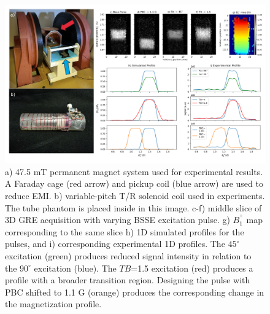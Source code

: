 \documentclass{article}
\renewcommand{\textcolor}[1]{}
\begin{document}
\begin{figure}[h]
\centering
\includegraphics[width=1.1\textwidth]{figures/experimental_2D_processed_Rev2.png}
\caption{a) 47.5 mT permanent magnet system used for experimental results. A Faraday cage (red arrow) and pickup coil (blue arrow) are used to reduce EMI. b) variable-pitch T/R solenoid coil used in experiments. The tube phantom is placed inside in this image. c-f) middle slice of 3D GRE acquisition with varying BSSE excitation pulse. g) $B_1^^+$ map corresponding to the same slice h) 1D simulated profiles for the pulses, and i) corresponding experimental 1D profiles. The $45^\circ$ excitation (green) produces reduced signal intensity in relation to the $90^\circ$ excitation (blue). The $TB$=1.5 excitation (red) produces a profile with a broader transition region. Designing the pulse with PBC shifted to 1.1 G (orange) produces the corresponding change in the magnetization profile. 
}
\label{fig:exp}
\end{figure}

\renewcommand{\figurename}{Supporting Information Figure}
\renewcommand\thefigure{S\arabic{figure}}
\setcounter{figure}{0}

\end{document}
